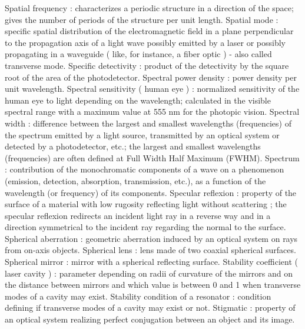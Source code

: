 Spatial frequency                                    : characterizes a periodic structure in a direction of the space; gives the number of periods of the structure per unit length.
Spatial mode                                         : specific spatial distribution of the electromagnetic field in a plane perpendicular to the propagation axis of a light wave possibly emitted by a laser or possibly propagating in a waveguide ( like, for instance, a fiber optic ) - also called transverse mode.
Specific detectivity                                 : product of the detectivity by the square root of the area of the photodetector.
Spectral power density                               : power density per unit wavelength.
Spectral sensitivity ( human eye )                   : normalized sensitivity of the human eye to light depending on the wavelength; calculated in the visible spectral range with a maximum value at 555 nm for the photopic vision.
Spectral width                                       : difference between the largest and smallest wavelengths (frequencies) of the spectrum emitted by a light source, transmitted by an optical system or detected by a photodetector, etc.; the largest and smallest wavelengths (frequencies) are often defined at Full Width Half Maximum (FWHM).
Spectrum                                             : contribution of the monochromatic components of a wave on a phenomenon (emission, detection, absorption, transmission, etc.), as a function of the wavelength (or frequency) of its components.
Specular reflexion                                   : property of the surface of a material with low rugosity reflecting light without scattering ; the specular reflexion redirects an incident light ray in a reverse way and in a direction symmetrical to the incident ray regarding the normal to the surface.
Spherical aberration                                 : geometric aberration induced by an optical system on rays from on-axis objects.
Spherical lens                                       : lens made of two coaxial spherical surfaces.
Spherical mirror                                     : mirror with a spherical reflecting surface.
Stability coefficient ( laser cavity )               : parameter depending on radii of curvature of the mirrors and on the distance between mirrors and which value is between 0 and 1 when transverse modes of a cavity may exist.
Stability condition of a resonator                   : condition defining if transverse modes of a cavity may exist or not.
Stigmatic                                            : property of an optical system realizing perfect conjugation between an object and its image.

